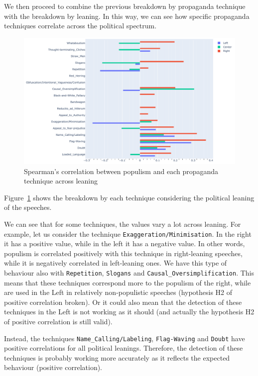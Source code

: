 We then proceed to combine the previous breakdown by propaganda technique with the breakdown by leaning. In this way, we can see how specific propaganda techniques correlate across the political spectrum.

\begin{figure}[!htbp]
    \centering
    \includegraphics[width=\linewidth]{figures/populism_propaganda_correlation_by_leaning.pdf}
    \caption{Spearman's correlation between populism and each propaganda technique across leaning}
    \label{fig:populism_propaganda_correlation_by_leaning}
\end{figure}

Figure~\ref{fig:populism_propaganda_correlation_by_leaning} shows the breakdown by each technique considering the political leaning of the speeches.

We can see that for some techniques, the values vary a lot across leaning. For example, let us consider the technique \texttt{Exaggeration/Minimisation}. In the right it has a positive value, while in the left it has a negative value. %
In other words, populism is correlated positively with this technique in right-leaning speeches, while it is negatively correlated in left-leaning ones. We have this type of behaviour also with \texttt{Repetition}, \texttt{Slogans} and \texttt{Causal\_Oversimplification}. This means that these techniques correspond more to the populism of the right, while are used in the Left in relatively non-populistic speeches (hypothesis H2 of positive correlation broken). Or it could also mean that the detection of these techniques in the Left is not working as it should (and actually the hypothesis H2 of positive correlation is still valid).

Instead, the techniques \texttt{Name\_Calling/Labeling}, \texttt{Flag-Waving} and \texttt{Doubt} have positive correlations for all political leanings.
Therefore, the detection of these techniques is probably working more accurately as it reflects the expected behaviour (positive correlation).

